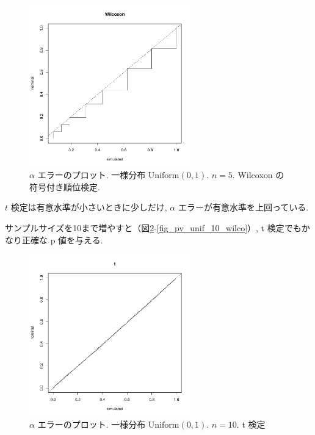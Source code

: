 \documentclass[12pt]{jsarticle}
\begin{document}
 \begin{figure}[htbp]
 \begin{center}
  \includegraphics[width=70mm]{img/pv_unif_5_wilco.pdf}
 \end{center}
       \caption{$\alpha$ エラーのプロット. 一様分布 $\mathrm{Uniform}(0,1)$. $n=5$. Wilcoxon の符号付き順位検定.}
  \label{fig_pv_unif_5_wilco}
\end{figure}

$t$ 検定は有意水準が小さいときに少しだけ, $\alpha$ エラーが有意水準を上回っている.

サンプルサイズを10まで増やすと（図\ref{fig_pv_unif_10_t}-\ref{fig_pv_unif_10_wilco}）, t 検定でもかなり正確な p 値を与える.

\begin{figure}[htbp]
  \begin{center}
\includegraphics[width=70mm]{img/pv_unif_10_t.pdf}
  \end{center}
     \caption{$\alpha$ エラーのプロット. 一様分布 $\mathrm{Uniform}(0,1)$. $n=10$. t 検定}
  \label{fig_pv_unif_10_t}
 \end{figure}
 
\end{document}

